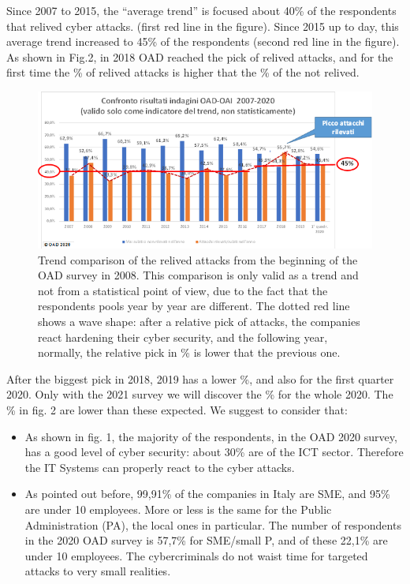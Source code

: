 \documentclass{easychair}
\begin{document}
Since 2007 to 2015, the “average trend” is focused about 40\% of the respondents that relived
cyber attacks. (first red line in the figure). Since 2015 up to day, this average trend increased to 45\% of the respondents (second red line in the figure). As shown in Fig.2, in 2018 OAD 
reached the pick of relived attacks, and  for the first time  the \% of relived attacks is higher that the \% of the not relived.


\begin{figure}
	\centering
		\includegraphics[width=1\textwidth]{pictures/fig2.png}
		\caption{Trend comparison of the relived attacks from the beginning of the OAD survey in 2008. This comparison is only valid as a trend and not from a statistical point 
of view, due to the fact that the respondents pools year by year are different. The dotted red line shows a wave shape: after a relative pick of attacks, the companies react hardening their cyber security, and the following year, normally, 
the relative pick in \% is lower that the previous one.}
		\label{fig:2}
\end{figure}

After the biggest pick in 2018, 2019 has a lower \%, and also for the first quarter 2020. Only with the 2021 survey we will discover the \% for the whole 2020. The \%  in fig. 2
are lower than these expected. We suggest to consider that:
 
\begin{itemize}
\item As shown in fig. 1, the majority of the respondents, in the OAD 2020 survey, has a good level of cyber security: about 30\% are of the ICT sector. 
Therefore the IT Systems can properly react to the cyber attacks. 

\item As pointed out before, 99,91\% of the companies in Italy are SME, and 95\% are under 10 employees. More or less is the same for the Public Administration (PA), 
the local ones in particular. The number of respondents in the 2020 OAD survey is 57,7\% for SME/small P, and of these 22,1\% are under 10 employees. 
The cybercriminals do not waist time for targeted attacks to very small realities.
\end{itemize}
\end{document}
